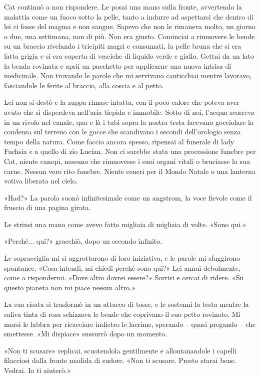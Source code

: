 Cat continuò a non rispondere. Le posai una mano sulla fronte,
avvertendo la malattia come un fuoco sotto la pelle, tanto a indurre ad
aspettarsi che dentro di lei ci fosse del magma e non sangue. Sapevo che
non le rimaneva molto, un giorno o due, una settimana, non di più. Non
era giusto. Cominciai a rimuovere le bende su un braccio rivelando i
tricipiti magri e consumati, la pelle bruna che si era fatta grigia e si
era coperta di vesciche di liquido verde e giallo. Gettai da un lato la
benda rovinata e aprii un pacchetto per applicarne una nuova intrisa di
medicinale. Non trovando le parole che mi servivano canticchiai mentre
lavoravo, fasciandole le ferite al braccio, alla coscia e al petto.

Lei non si destò e la zuppa rimase intatta, con il poco calore che
poteva aver avuto che si disperdeva nell'aria tiepida e immobile. Sotto
di noi, l'acqua scorreva in un rivolo nel canale, qua e là i tubi sopra
la nostra testa facevano gocciolare la condensa sul terreno con le gocce
che scandivano i secondi dell'orologio senza tempo della natura. Come
faccio ancora spesso, ripensai al funerale di lady Fuchsia e a quello di
zio Lucian. Non ci sarebbe stata una processione funebre per Cat, niente
canopi, nessuno che {rimuovesse} i suoi organi vitali o bruciasse la sua
carne. Nessun vero rito funebre. Niente ceneri per il Mondo Natale o una
lanterna votiva liberata nel cielo.

«Had?» La parola suonò infinitesimale come un angstrom, la voce fievole
come il fruscio di una pagina girata.

Le strinsi una mano come avevo fatto migliaia di migliaia di volte.
«Sono qui.»

«Perché... qui?» gracchiò, dopo un secondo infinito.

Le sopracciglia mi si aggrottarono di loro iniziativa, e le parole mi
sfuggirono spontanee. «Cosa intendi, mi chiedi perché sono qui?» Lei
annuì debolmente, come a rispondermi. «Dove altro dovrei essere?»
Sorrisi e cercai di ridere. «Su questo pianeta non mi piace nessun
altro.»

La sua risata si trasformò in un attacco di tosse, e le sostenni la
testa mentre la saliva tinta di rosa schizzava le bende che coprivano il
suo petto rovinato. Mi morsi le labbra per ricacciare indietro le
lacrime, sperando -- quasi pregando -- che smettesse. «Mi dispiace»
sussurrò dopo un momento.

«Non ti scusare» replicai, scuotendola gentilmente e allontanandole i
capelli filacciosi dalla fronte madida di sudore. «Non ti scusare.
Presto starai bene. Vedrai. Io ti aiuterò.»

